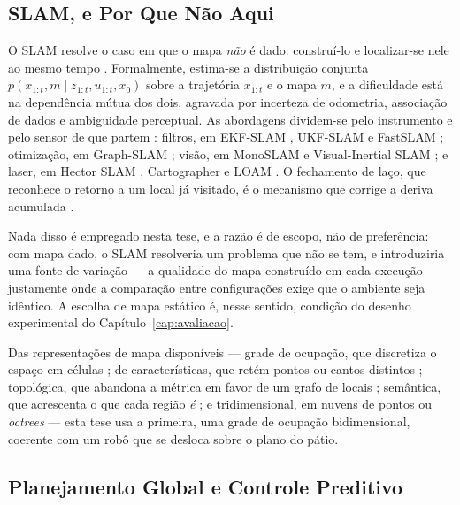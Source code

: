 \subsection{SLAM, e Por Que Não Aqui}

O \ac{SLAM} resolve o caso em que o mapa \emph{não} é dado: construí-lo e localizar-se
nele ao mesmo tempo \cite{Durrant2006, Thrun2005}. Formalmente, estima-se a distribuição
conjunta $p(x_{1:t}, m \mid z_{1:t}, u_{1:t}, x_0)$ sobre a trajetória $x_{1:t}$ e o mapa
$m$, e a dificuldade está na dependência mútua dos dois, agravada por incerteza de
odometria, associação de dados e ambiguidade perceptual. As abordagens dividem-se pelo
instrumento e pelo sensor de que partem \cite{Cadena2016}: filtros, em EKF-SLAM
\cite{Smith1990}, UKF-SLAM \cite{Julier2004} e FastSLAM \cite{Montemerlo2002}; otimização,
em Graph-SLAM \cite{Grisetti2010}; visão, em MonoSLAM \cite{Davison2007} e Visual-Inertial
SLAM \cite{Mourikis2007}; e laser, em Hector SLAM \cite{Kohlbrecher2011}, Cartographer
\cite{Hess2016} e LOAM \cite{Zhang2014}. O fechamento de laço, que reconhece o retorno a
um local já visitado, é o mecanismo que corrige a deriva acumulada \cite{Durrant2006}.

Nada disso é empregado nesta tese, e a razão é de escopo, não de preferência: com mapa
dado, o \ac{SLAM} resolveria um problema que não se tem, e introduziria uma fonte de
variação --- a qualidade do mapa construído em cada execução --- justamente onde a
comparação entre configurações exige que o ambiente seja idêntico. A escolha de mapa
estático é, nesse sentido, condição do desenho experimental do
Capítulo~\ref{cap:avaliacao}.

Das representações de mapa disponíveis \cite{Thrun2005, Cadena2016} --- grade de ocupação,
que discretiza o espaço em células \cite{Elfes1989}; de características, que retém pontos
ou cantos distintos \cite{Smith1990}; topológica, que abandona a métrica em favor de um
grafo de locais \cite{Kuipers1991}; semântica, que acrescenta o que cada região
\emph{é} \cite{Kostavelis2015}; e tridimensional, em nuvens de pontos ou
\textit{octrees} \cite{Hornung2013} --- esta tese usa a primeira, uma grade de ocupação
bidimensional, coerente com um robô que se desloca sobre o plano do pátio.

\subsection{Planejamento Global e Controle Preditivo}
\label{sec:fund-nav2}

